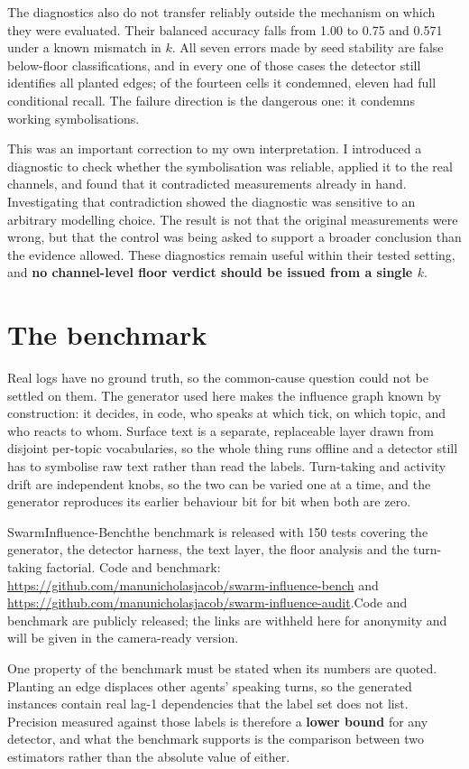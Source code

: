 \documentclass[10pt]{article}
\makeatletter
\newcommand{\ifdeanon}[2]{\if@accepted#1\else#2\fi}
\newcommand{\benchname}{\ifdeanon{SwarmInfluence-Bench}{the benchmark}}
\makeatother
\begin{document}
The diagnostics also do not transfer reliably outside the mechanism on which they were evaluated.
Their balanced accuracy falls from 1.00 to 0.75 and 0.571 under a known mismatch in $k$. All seven
errors made by seed stability are false below-floor classifications, and in every one of those cases
the detector still identifies all planted edges; of the fourteen cells it condemned, eleven had full
conditional recall. The failure direction is the dangerous one: it condemns working symbolisations.

This was an important correction to my own interpretation. I introduced a diagnostic to check whether
the symbolisation was reliable, applied it to the real channels, and found that it contradicted
measurements already in hand. Investigating that contradiction showed the diagnostic was sensitive to
an arbitrary modelling choice. The result is not that the original measurements were wrong, but that
the control was being asked to support a broader conclusion than the evidence allowed. These
diagnostics remain useful within their tested setting, and \textbf{no channel-level floor verdict
should be issued from a single $k$}.

\section{The benchmark}

Real logs have no ground truth, so the common-cause question could not be settled on them. The
generator used here makes the influence graph known by construction: it decides, in code, who speaks
at which tick, on which topic, and who reacts to whom. Surface text is a separate, replaceable layer
drawn from disjoint per-topic vocabularies, so the whole thing runs offline and a detector still has
to symbolise raw text rather than read the labels. Turn-taking and activity drift are independent
knobs, so the two can be varied one at a time, and the generator reproduces its earlier behaviour
bit for bit when both are zero.

\benchname{} is released with 150 tests covering the generator, the detector harness, the text layer,
the floor analysis and the turn-taking factorial.
\ifdeanon{Code and benchmark:
\url{https://github.com/manunicholasjacob/swarm-influence-bench} and
\url{https://github.com/manunicholasjacob/swarm-influence-audit}.}{Code and benchmark are publicly
released; the links are withheld here for anonymity and will be given in the camera-ready version.}

One property of the benchmark must be stated when its numbers are quoted. Planting an edge displaces
other agents' speaking turns, so the generated instances contain real lag-1 dependencies that the
label set does not list. Precision measured against those labels is therefore a \textbf{lower bound}
for any detector, and what the benchmark supports is the comparison between two estimators rather
than the absolute value of either.
\end{document}
